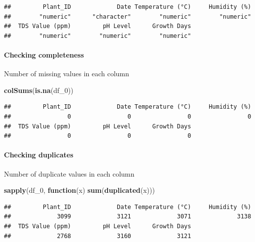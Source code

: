 \documentclass[
]{article}
\newenvironment{Shaded}{\begin{snugshade}}{\end{snugshade}}
\newcommand{\ControlFlowTok}[1]{\textcolor[rgb]{0.13,0.29,0.53}{\textbf{#1}}}
\newcommand{\FunctionTok}[1]{\textcolor[rgb]{0.13,0.29,0.53}{\textbf{#1}}}
\newcommand{\NormalTok}[1]{#1}
\begin{document}
\begin{verbatim}
##         Plant_ID             Date Temperature (°C)     Humidity (%) 
##        "numeric"      "character"        "numeric"        "numeric" 
##  TDS Value (ppm)         pH Level      Growth Days 
##        "numeric"        "numeric"        "numeric"
\end{verbatim}

\paragraph{Checking completeness}\label{checking-completeness}

Number of missing values in each column

\begin{Shaded}
\begin{Highlighting}[]
\FunctionTok{colSums}\NormalTok{(}\FunctionTok{is.na}\NormalTok{(df\_0))}
\end{Highlighting}
\end{Shaded}

\begin{verbatim}
##         Plant_ID             Date Temperature (°C)     Humidity (%) 
##                0                0                0                0 
##  TDS Value (ppm)         pH Level      Growth Days 
##                0                0                0
\end{verbatim}

\paragraph{Checking duplicates}\label{checking-duplicates}

Number of duplicate values in each column

\begin{Shaded}
\begin{Highlighting}[]
\FunctionTok{sapply}\NormalTok{(df\_0, }\ControlFlowTok{function}\NormalTok{(x) }\FunctionTok{sum}\NormalTok{(}\FunctionTok{duplicated}\NormalTok{(x)))}
\end{Highlighting}
\end{Shaded}

\begin{verbatim}
##         Plant_ID             Date Temperature (°C)     Humidity (%) 
##             3099             3121             3071             3138 
##  TDS Value (ppm)         pH Level      Growth Days 
##             2768             3160             3121
\end{verbatim}
\end{document}
